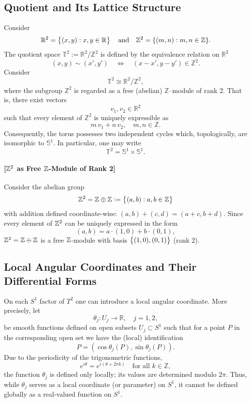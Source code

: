 \documentclass[11pt,openany]{article}
\begin{document}
\subsection{Quotient and Its Lattice Structure}
Consider \[
\mathbb{R}^2=\set{(x,y):x,y\in\mathbb{R}}\quad\text{and}\quad\mathbb{Z}^2 = \{(m,n) : m,n \in \mathbb{Z}\}.
\] The quotient space $\mathbb{T}^2 := \mathbb{R}^2/\mathbb{Z}^2$ is defined by the equivalence relation on \(\mathbb{R}^2\) \[
(x,y) \sim (x',y') \quad \Longleftrightarrow \quad (x-x',y-y') \in \mathbb{Z}^2.
\]
Consider \[
\mathbb{T}^2 \cong \mathbb{R}^2/\mathbb{Z}^2,
\] where the subgroup \(\mathbb{Z}^2\) is regarded as a free (abelian) \(\mathbb{Z}\)–module of rank 2. That is, there exist vectors 
\[
v_1, v_2 \in \mathbb{R}^2
\]
such that every element of \(\mathbb{Z}^2\) is uniquely expressible as 
\[
m\,v_1 + n\,v_2,\quad m,n \in \mathbb{Z}.
\]
Consequently, the torus possesses two independent cycles which, topologically, are isomorphic to \(\mathbb{S}^1\). In particular, one may write
\[
\mathbb{T}^2 = \mathbb{S}^1 \times \mathbb{S}^1.
\]

\paragraph{[$\mathbb{Z}^2$ as Free $\mathbb{Z}$-Module of Rank 2]}
Consider the abelian group \[
\mathbb{Z}^2=\mathbb{Z}\oplus\mathbb{Z}:=\set{(a,b):a,b\in\mathbb{Z}}
\] with addition defined coordinate-wise: $(a,b)+(c,d)=(a+c,b+d)$. Since every element of $\mathbb{Z}^2$ can be uniquely expressed in the form \[
(a,b) = a\cdot (1,0) + b\cdot (0,1),
\] $\mathbb{Z}^2=\mathbb{Z}\oplus\mathbb{Z}$ is a free $\mathbb{Z}$-module with basis $\set{(1,0),(0,1)}$ (rank 2).


\subsection{Local Angular Coordinates and Their Differential Forms}
On each \(S^1\) factor of \(T^2\) one can introduce a local angular coordinate. More precisely, let
\[
\theta_j: U_j \to \mathbb{R},\quad j=1,2,
\]
be smooth functions defined on open subsets \(U_j \subset S^1\) such that for a point \(P\) in the corresponding open set we have the (local) identification
\[
P = (\cos\theta_j(P),\sin\theta_j(P)).
\]
Due to the periodicity of the trigonometric functions,
\[
e^{i\theta} = e^{i(\theta+2\pi k)}\quad \text{for all } k\in\mathbb{Z},
\]
the function \(\theta_j\) is defined only locally; its values are determined modulo \(2\pi\). Thus, while \(\theta_j\) serves as a local coordinate (or parameter) on \(S^1\), it cannot be defined globally as a real-valued function on \(S^1\).
\end{document}
